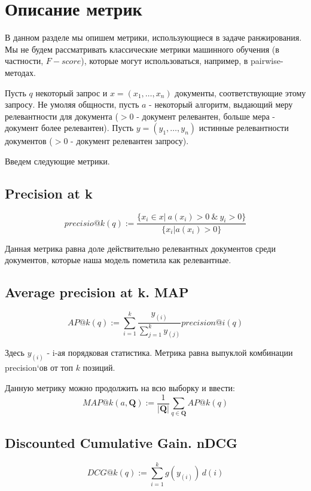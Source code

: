 \documentclass{article}[16pt]
\begin{document}
\section{Описание метрик}
	В данном разделе мы опишем метрики, использующиеся в задаче ранжирования. Мы не будем рассматривать классические метрики машинного обучения (в частности, $F-score$), которые могут использоваться, например, в pairwise-методах.
	
	Пусть $q$ некоторый запрос и $x = (x_1, \dots, x_n)$ документы, соответствующие этому запросу. Не умоляя общности, пусть $a$ - некоторый алгоритм, выдающий меру релевантности для документа ($>0$ - документ релевантен, больше мера - документ более релевантен). Пусть $y = (y_1, \dots, y_n)$ истинные релевантности документов ($>0$ - документ релевантен запросу).
	
	Введем следующие метрики.
	
	\subsection{Precision at k}
	\begin{equation}
		precisio@k(q) := \frac{\{x_i \in x | ~ a(x_i) > 0 ~ \& ~ y_i > 0\}}{\{x_i | a(x_i) > 0\}}
	\end{equation}

	Данная метрика равна доле действительно релевантных документов среди документов, которые наша модель пометила как релевантные.
	
	\subsection{Average precision at k. MAP}
	\begin{equation}
		AP@k(q) := \sum_{i=1}^{k} \frac{y_{(i)}}{\sum_{j=1}^{k}y_{(j)}}precision@i(q)
	\end{equation}
	
	Здесь $y_{(i)}$ - i-ая порядковая статистика. Метрика равна выпуклой комбинации precision`ов от топ $k$ позиций. 
	
	Данную метрику можно продолжить на всю выборку и ввести:
	\begin{equation}
		MAP@k(a, \mathbf{Q}) := \frac1{|\mathbf{Q}|}\sum_{q \in \mathbf{Q}} AP@k(q)
	\end{equation}
	
	\subsection{Discounted Cumulative Gain. nDCG}
	\begin{equation}
		DCG@k(q) := \sum_{i=1}^{k} g(y_{(i)}) \, d(i)
	\end{equation}
	
\end{document}
